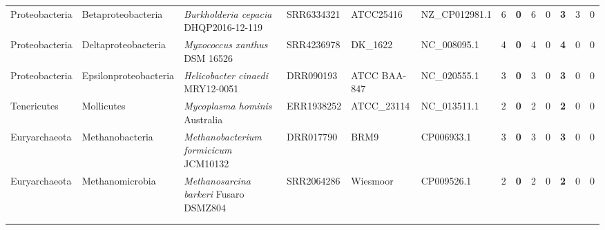 \begin{sidewaystable}[!hb]
\begin{tabular}{p{2.25cm}p{2.65cm}p{5.75cm}p{1.75cm}p{2.25cm}p{1.95cm}p{.6cm}>{\hfill}p{.4cm}p{.2cm}p{.1cm}>{\hfill}p{.4cm}p{.2cm}p{.1cm}}
    Proteobacteria & Betaproteobacteria    & \textit{Burkholderia     cepacia}      DHQP2016-12-119                                       & SRR6334321 & ATCC25416       & NZ\_CP012981.1    & 6  & \textbf{0} & 6  & 0 & \textbf{3} & 3 & 0 \\
    Proteobacteria & Deltaproteobacteria   & \textit{Myxococcus       xanthus}      DSM 16526                                             & SRR4236978 & DK\_1622 & NC\_008095.1
  & 4  & \textbf{0} & 4  & 0 & \textbf{4} & 0 & 0 \\
    Proteobacteria & Epsilonproteobacteria & \textit{Helicobacter     cinaedi}      MRY12-0051                                            & DRR090193  & ATCC BAA-847 & NC\_020555.1 & 3  & \textbf{0} & 3  & 0 & \textbf{3} & 0 & 0 \\
    Tenericutes    & Mollicutes            & \textit{Mycoplasma       hominis}      Australia                                             & ERR1938252 & ATCC\_23114  &NC\_013511.1       & 2  & \textbf{0} & 2  & 0 & \textbf{2} & 0 & 0 \\
    Euryarchaeota  & Methanobacteria       & \textit{Methanobacterium formicicum}   JCM10132                                              & DRR017790  & BRM9        &CP006933.1        & 3  & \textbf{0} & 3  & 0 & \textbf{3} & 0 & 0 \\
    Euryarchaeota  & Methanomicrobia       & \textit{Methanosarcina    barkeri}     Fusaro DSMZ804                                        & SRR2064286 & Wiesmoor    &CP009526.1        & 2  & \textbf{0} & 2  & 0 & \textbf{2} & 0 & 0 \\

    \bottomrule
    \begin{minipage}[t]{.5\textwidth}
      {\tiny
        $\checkmark$  correct assembly; --  unnassembled; $\times$  incorrect assembly\\
      }
    \end{minipage}
  \end{tabular}
\end{sidewaystable}
